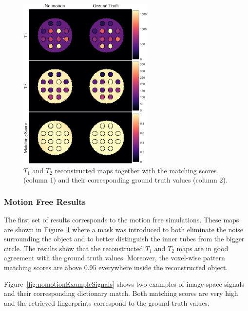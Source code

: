 \begin{figure}[ht]
    \centering
    \includegraphics[width=0.6\textwidth]{images/mrf/T1T2ScoreNoMotion}
    \caption{$T_1$ and $T_2$ reconstructed maps together with the matching scores (column 1) and their corresponding ground truth values (column 2).}
    \label{fig:T1T2ScoreMapNoMotion}
\end{figure}

\subsubsection{Motion Free Results}
The first set of results corresponds to the motion free simulations.
These maps are shown in Figure~\ref{fig:T1T2ScoreMapNoMotion} where a mask was introduced to both eliminate the noise surrounding the object and to better distinguish the inner tubes from the bigger circle.
The results show that the reconstructed $T_1$ and $T_2$ maps are in good agreement with the ground truth values.
Moreover, the voxel-wise pattern matching scores are above 0.95 everywhere inside the reconstructed object.

\hfill

Figure~\ref{fig:nomotionExampleSignals} shows two examples of image space signals and their corresponding dictionary match.
Both matching scores are very high and the retrieved fingerprints correspond to the ground truth values. 


